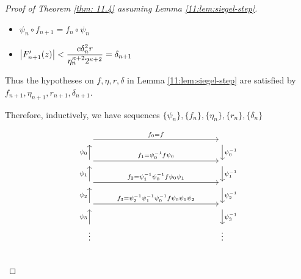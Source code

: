 \documentclass[../main.tex]{subfiles}
\begin{document}
\begin{proof}[Proof of Theorem \ref{thm: 11.4} assuming Lemma \ref{11:lem:siegel-step}]
\begin{itemize}
    \item $\psi_n \circ f_{n+1} = f_n \circ \psi_n$
    \item $\left|F_{n+1}'(z)\right| < \dfrac{c \delta_n^2 r}{\eta_n^{\kappa+2}2^{\kappa+2}} = \delta_{n+1}$
\end{itemize}

Thus the hypotheses on $f, \eta, r, \delta$ in Lemma \ref{11:lem:siegel-step} are satisfied by $f_{n+1}, \eta_{n+1}, r_{n+1}, \delta_{n+1}$.

Therefore, inductively, we have sequences $\{\psi_n\}, \{f_n\}, \{\eta_n\}, \{r_n\}, \{\delta_n\}$

    \[
        \begin{tikzcd}
        \ar[r, "f_0 = f"] &[12em] \ar[d, "\psi_0\inv"]\\
        \ar[r, "f_1 = \psi_0 \inv f \psi_0"]
        \ar[u, "\psi_0"] & \ar[d, "\psi_1\inv"]\\
        \ar[r, "f_2 = \psi_1\inv \psi_0 \inv f \psi_0 \psi_1"]
        \ar[u, "\psi_1"] & \ar[d, "\psi_2\inv"]\\
        \ar[r, "f_3 = \psi_2\inv \psi_1\inv \psi_0 \inv f \psi_0 \psi_1 \psi_2"]
        \ar[u, "\psi_2"] & \ar[d, "\psi_3\inv"]\\
        \vdots \ar[u, "\psi_3"] & \vdots\\
        \end{tikzcd}
    \]


\end{proof}
\end{document}
